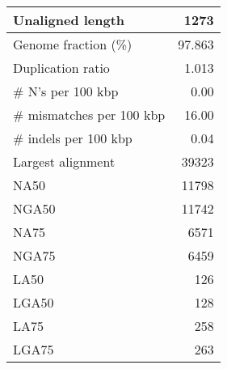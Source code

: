 \documentclass[12pt,a4paper]{article}
\begin{document}
\begin{table}[ht]
\begin{center}
\begin{tabular}{|l*{1}{|r}|}
Unaligned length & 1273 \\ \hline
Genome fraction (\%) & 97.863 \\ \hline
Duplication ratio & 1.013 \\ \hline
\# N's per 100 kbp & 0.00 \\ \hline
\# mismatches per 100 kbp & 16.00 \\ \hline
\# indels per 100 kbp & 0.04 \\ \hline
Largest alignment & 39323 \\ \hline
NA50 & 11798 \\ \hline
NGA50 & 11742 \\ \hline
NA75 & 6571 \\ \hline
NGA75 & 6459 \\ \hline
LA50 & 126 \\ \hline
LGA50 & 128 \\ \hline
LA75 & 258 \\ \hline
LGA75 & 263 \\ \hline
\end{tabular}
\end{center}
\end{table}
\end{document}
